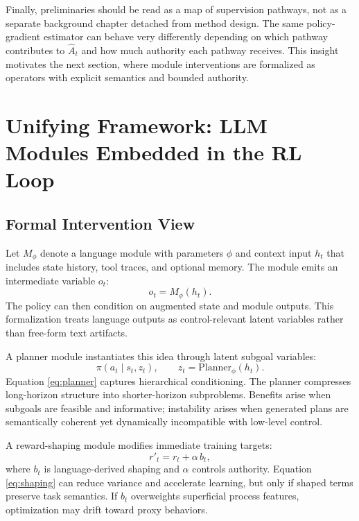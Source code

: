 \documentclass[pdflatex,sn-mathphys-num]{sn-jnl}
\begin{document}
Finally, preliminaries should be read as a map of supervision pathways, not as a separate background chapter detached from method design. The same policy-gradient estimator can behave very differently depending on which pathway contributes to $\hat{A}_t$ and how much authority each pathway receives. This insight motivates the next section, where module interventions are formalized as operators with explicit semantics and bounded authority.

\section{Unifying Framework: LLM Modules Embedded in the RL Loop}
\subsection{Formal Intervention View}
Let $M_\phi$ denote a language module with parameters $\phi$ and context input $h_t$ that includes state history, tool traces, and optional memory. The module emits an intermediate variable $o_t$:
\begin{equation}
o_t=M_\phi(h_t).
\end{equation}
The policy can then condition on augmented state and module outputs. This formalization treats language outputs as control-relevant latent variables rather than free-form text artifacts.

A planner module instantiates this idea through latent subgoal variables:
\begin{equation}
\pi(a_t\mid s_t,z_t),\qquad z_t=\mathrm{Planner}_{\phi}(h_t).
\label{eq:planner}
\end{equation}
Equation \eqref{eq:planner} captures hierarchical conditioning. The planner compresses long-horizon structure into shorter-horizon subproblems. Benefits arise when subgoals are feasible and informative; instability arises when generated plans are semantically coherent yet dynamically incompatible with low-level control.

A reward-shaping module modifies immediate training targets:
\begin{equation}
r'_t=r_t+\alpha\,b_t,
\label{eq:shaping}
\end{equation}
where $b_t$ is language-derived shaping and $\alpha$ controls authority. Equation \eqref{eq:shaping} can reduce variance and accelerate learning, but only if shaped terms preserve task semantics. If $b_t$ overweights superficial process features, optimization may drift toward proxy behaviors.
\end{document}
